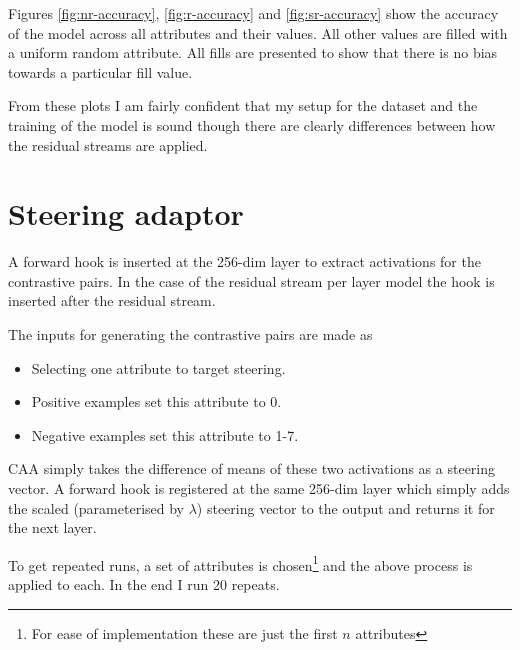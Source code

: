 Figures \ref{fig:nr-accuracy}, \ref{fig:r-accuracy} and \ref{fig:sr-accuracy} show the accuracy of the model across all attributes and their values.
All other values are filled with a uniform random attribute.
All fills are presented to show that there is no bias towards a particular fill value.

From these plots I am fairly confident that my setup for the dataset and the training of the model is sound though there are clearly differences between how the residual streams are applied.

\section{Steering adaptor}

A forward hook is inserted at the 256-dim layer to extract activations for the contrastive pairs.
In the case of the residual stream per layer model the hook is inserted after the residual stream.

The inputs for generating the contrastive pairs are made as

\begin{itemize}[nolistsep]
    \item Selecting one attribute to target steering.
    \item Positive examples set this attribute to 0.
    \item Negative examples set this attribute to 1-7.
\end{itemize}

CAA simply takes the difference of means of these two activations as a steering vector.
A forward hook is registered at the same 256-dim layer which simply adds the scaled (parameterised by $\lambda$) steering vector to the output and returns it for the next layer.

To get repeated runs, a set of attributes is chosen\footnote{For ease of implementation these are just the first $n$ attributes} and the above process is applied to each.
In the end I run 20 repeats.

